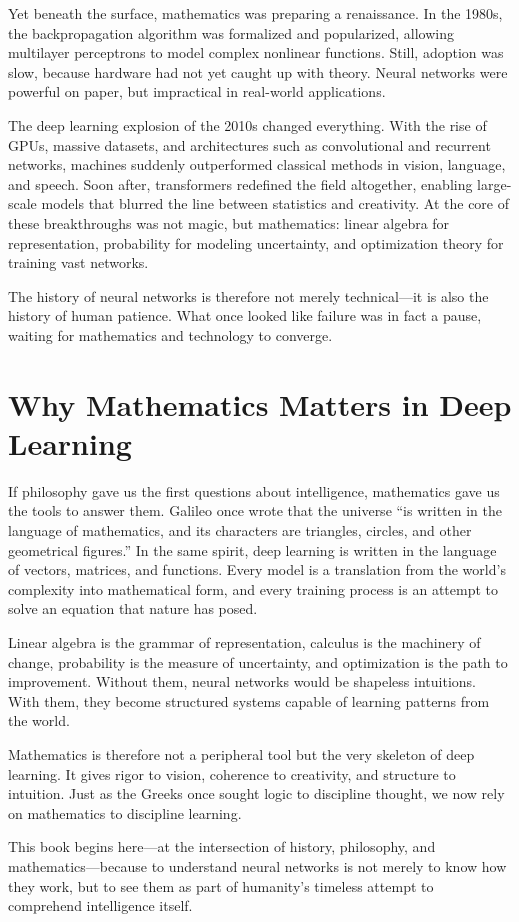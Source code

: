 Yet beneath the surface, mathematics was preparing a renaissance. In the 1980s, the backpropagation algorithm was formalized and popularized, allowing multilayer perceptrons to model complex nonlinear functions. Still, adoption was slow, because hardware had not yet caught up with theory. Neural networks were powerful on paper, but impractical in real-world applications.

The deep learning explosion of the 2010s changed everything. With the rise of GPUs, massive datasets, and architectures such as convolutional and recurrent networks, machines suddenly outperformed classical methods in vision, language, and speech. Soon after, transformers redefined the field altogether, enabling large-scale models that blurred the line between statistics and creativity. At the core of these breakthroughs was not magic, but mathematics: linear algebra for representation, probability for modeling uncertainty, and optimization theory for training vast networks.

The history of neural networks is therefore not merely technical—it is also the history of human patience. What once looked like failure was in fact a pause, waiting for mathematics and technology to converge.

\section{Why Mathematics Matters in Deep Learning}

If philosophy gave us the first questions about intelligence, mathematics gave us the tools to answer them. Galileo once wrote that the universe ``is written in the language of mathematics, and its characters are triangles, circles, and other geometrical figures.'' In the same spirit, deep learning is written in the language of vectors, matrices, and functions. Every model is a translation from the world’s complexity into mathematical form, and every training process is an attempt to solve an equation that nature has posed.

Linear algebra is the grammar of representation, calculus is the machinery of change, probability is the measure of uncertainty, and optimization is the path to improvement. Without them, neural networks would be shapeless intuitions. With them, they become structured systems capable of learning patterns from the world.

Mathematics is therefore not a peripheral tool but the very skeleton of deep learning. It gives rigor to vision, coherence to creativity, and structure to intuition. Just as the Greeks once sought logic to discipline thought, we now rely on mathematics to discipline learning.

This book begins here—at the intersection of history, philosophy, and mathematics—because to understand neural networks is not merely to know how they work, but to see them as part of humanity’s timeless attempt to comprehend intelligence itself.


